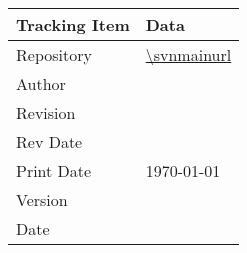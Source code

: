 
\begin{table}[htbp]
	\centering
		\begin{tabular}{|p{1.5in}|p{4.9in}|}
		\hline
			{\bfseries Tracking Item}  &  {\bfseries Data} \\
		\hline		
		\hline
			Repository         & \url{\svnmainurl}  \\
		\hline
			Author         & \svnauthor  \\			
		\hline
			Revision       & \svnrev     \\	
		\hline
			Rev Date       & \svndate    \\	
		\hline	
			Print Date     & \today{} \currenttime    \\	
		\hline
			\KNEADdocumentClsName\break Version     & \KNEADdocumentClsVersion    \\	
		\hline	
			\KNEADdocumentClsName\break Date        & \KNEADdocumentClsDate   \\	
		\hline
		\hline						
    \end{tabular}
\end{table}